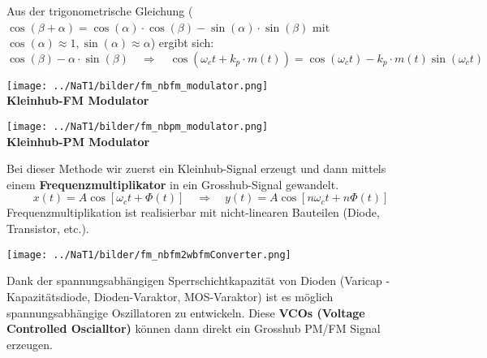 
Aus der trigonometrische Gleichung ($\cos(\beta + \alpha) = \cos(\alpha) \cdot \cos(\beta) -
\sin(\alpha) \cdot \sin(\beta)$ mit $\cos(\alpha) \approx 1, \sin(\alpha) \approx \alpha$) ergibt
sich: \\
$$\cos(\beta) - \alpha \cdot \sin(\beta) \quad \Rightarrow \quad \cos(\omega_c t + k_p \cdot m(t))
= \cos(\omega_c t) - k_p \cdot m(t) \sin(\omega_c t)$$

\begin{minipage}[t][3cm][c]{9cm}	
	\begin{center}
  		\texttt{[image: ../NaT1/bilder/fm\_nbfm\_modulator.png]} \\
  		\textbf{Kleinhub-FM Modulator}
	\end{center}
\end{minipage}
\begin{minipage}[t][3cm][c]{9cm} 
	\begin{center}
		\texttt{[image: ../NaT1/bilder/fm\_nbpm\_modulator.png]} \\ 
  		\textbf{Kleinhub-PM Modulator}
	\end{center}
\end{minipage}

\begin{minipage}[t][3cm][c]{10cm}	
	Bei dieser Methode wir zuerst ein Kleinhub-Signal erzeugt und dann mittels einem
	\textbf{Frequenzmultiplikator} in ein Grosshub-Signal gewandelt.
	$$ x(t) = A \cos[\omega_c t + \Phi(t)] \quad \Rightarrow \quad y(t) = A \cos[n \omega _c t + n
	\Phi(t)]$$ Frequenzmultiplikation ist realisierbar mit nicht-linearen Bauteilen (Diode, Transistor,
	etc.).
\end{minipage}
\begin{minipage}[t][3cm][c]{8.5cm} 
	\begin{center}
		\texttt{[image: ../NaT1/bilder/fm\_nbfm2wbfmConverter.png]}
	\end{center}
\end{minipage}

Dank der spannungsabhängigen Sperrschichtkapazität von Dioden (Varicap - Kapazitätsdiode,
Dioden-Varaktor, MOS-Varaktor) ist es möglich spannungsabhängige Oszillatoren zu entwickeln. Diese \textbf{VCOs
(Voltage Controlled Oscialltor)} können dann direkt ein Grosshub PM/FM Signal
erzeugen.\\

